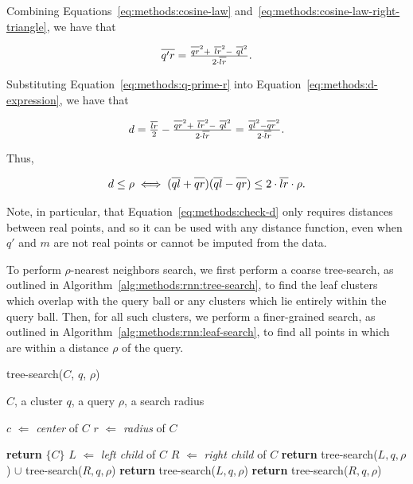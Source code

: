Combining Equations~\ref{eq:methods:cosine-law} and~\ref{eq:methods:cosine-law-right-triangle}, we have that

\begin{equation}
    \overline{q' r \vphantom{l}} = \tfrac{\overline{q r \vphantom{l}}^2 + \ \overline{l r}^2 - \ \overline{q l}^2}{2 \cdot \overline{l r}}.
    \label{eq:methods:q-prime-r}
\end{equation}

Substituting Equation~\ref{eq:methods:q-prime-r} into Equation~\ref{eq:methods:d-expression}, we have that

\begin{equation*}
    d = \tfrac{\overline{l r}}{2} - \tfrac{\overline{q r \vphantom{l}}^2 + \ \overline{l r}^2 - \ \overline{q l}^2}{2 \cdot \overline{l r}} = \tfrac{\overline{q l}^2 - \overline{q r \vphantom{l}}^2}{2 \cdot \overline{l r}}.
\end{equation*}

Thus,

\begin{equation}
    d \leq \rho \iff (\overline{q l} + \overline{q r \vphantom{l}})(\overline{q l} - \overline{q r \vphantom{l}}) \leq 2 \cdot \overline{l r} \cdot \rho.
    \label{eq:methods:check-d}
\end{equation}

Note, in particular, that Equation~\ref{eq:methods:check-d} only requires distances between real points, and so it can be used with any distance function, even when $q'$ and $m$ are not real points or cannot be imputed from the data.

To perform $\rho$-nearest neighbors search, we first perform a coarse tree-search, as outlined in Algorithm~\ref{alg:methods:rnn:tree-search}, to find the leaf clusters which overlap with the query ball or any clusters which lie entirely within the query ball.
Then, for all such clusters, we perform a finer-grained search, as outlined in Algorithm~\ref{alg:methods:rnn:leaf-search}, to find all points in which are within a distance $\rho$ of the query.

\begin{algorithm} 
    \caption{tree-search($C$, $q$, $\rho$)} 
    \label{alg:methods:rnn:tree-search} 
    \begin{algorithmic}
        \REQUIRE $C$, a cluster
        \REQUIRE $q$, a query
        \REQUIRE $\rho$, a search radius

        \STATE $c$ $\Leftarrow$ \emph{center} of $C$
        \STATE $r$ $\Leftarrow$ \emph{radius} of $C$

            \STATE \textbf{return} $\{C\}$
            \STATE $L$ $\Leftarrow$ \emph{left child} of $C$
            \STATE $R$ $\Leftarrow$ \emph{right child} of $C$
            \STATE \textbf{return} tree-search($L, q, \rho$) $\cup$ tree-search($R, q, \rho$)
            \STATE \textbf{return} tree-search($L, q, \rho$)
        \ELSE
            \STATE \textbf{return} tree-search($R, q, \rho$)
        \ENDIF
    \end{algorithmic}
\end{algorithm}

